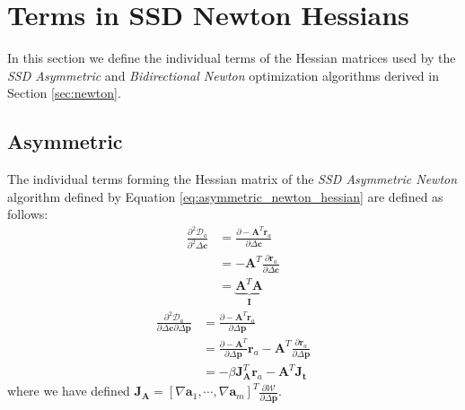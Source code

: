 \pagebreak

\section{Terms in SSD Newton Hessians}
\label{sec:app1}

In this section we define the individual terms of the Hessian matrices used by the \emph{SSD Asymmetric} and \emph{Bidirectional Newton} optimization algorithms derived in Section \ref{sec:newton}.

\subsection{Asymmetric}
\label{sec:app11}

The individual terms forming the Hessian matrix of the \emph{SSD Asymmetric Newton} algorithm defined by Equation \ref{eq:asymmetric_newton_hessian} are defined as follows:
\begin{equation}
    \begin{aligned}
		\frac{\partial^2 \mathcal{D}_a}{\partial^2 \Delta \mathbf{c}} & = \frac{\partial -\mathbf{A}^T \mathbf{r}_a}{\partial \Delta \mathbf{c}}
		\\
		& = -\mathbf{A}^T \frac{\partial \mathbf{r}_a}{\partial \Delta \mathbf{c}}
		\\
		& = \underbrace{\mathbf{A}^T \mathbf{A}}_{\mathbf{I}}
    \label{eq:asymmetric_hessian_term1}
    \end{aligned}
\end{equation}
\begin{equation}
    \begin{aligned}
		\frac{\partial^2 \mathcal{D}_a}{\partial \Delta \mathbf{c} \partial \Delta \mathbf{p}} & = \frac{\partial -\mathbf{A}^T \mathbf{r}_a}{\partial \Delta \mathbf{p}}
		\\
		& = \frac{\partial -\mathbf{A}^T}{\partial \Delta \mathbf{p}} \mathbf{r}_a - \mathbf{A}^T \frac{\partial\mathbf{r}_a}{\partial \Delta \mathbf{p}}
		\\
		& = -\beta \mathbf{J}_\mathbf{A}^T \mathbf{r}_a - \mathbf{A}^T \mathbf{J}_{\mathbf{t}}
    \label{eq:asymmetric_hessian_term2}
    \end{aligned}
\end{equation}
where we have defined $\mathbf{J}_\mathbf{A} = [\nabla \mathbf{a}_1, \cdots, \nabla \mathbf{a}_m]^T \frac{\partial\mathcal{W}}{\partial \Delta \mathbf{p}}$.

